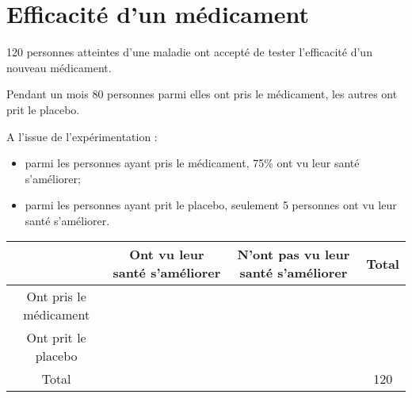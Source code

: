 \section{Efficacité d'un médicament}

120 personnes atteintes d'une maladie ont accepté de tester l'efficacité d'un nouveau médicament. 

Pendant un mois 80 personnes parmi elles ont pris le médicament, les autres ont prit le placebo.

A l'issue de l'expérimentation :
\begin{itemize}
	\item parmi les personnes ayant pris le médicament, 75\% ont vu leur santé s'améliorer;
	\item parmi les personnes ayant prit le placebo, seulement 5 personnes ont vu leur santé s'améliorer.
\end{itemize} 
\begin{center}
	
{\small \begin{tabular}{|@{\ }c@{\ }|@{\ }c@{\ }|@{\ }c@{\ }|@{\ }c@{\ }|}
	\hline
	& Ont vu leur santé s'améliorer & N'ont pas vu leur santé s'améliorer &  Total  \\
	\hline
	Ont pris le médicament &  &  &    \\
	\hline
	Ont prit le placebo &  &  &   \\
	\hline
	Total &  &  & 120   \\
	\hline
\end{tabular}}
\end{center}



